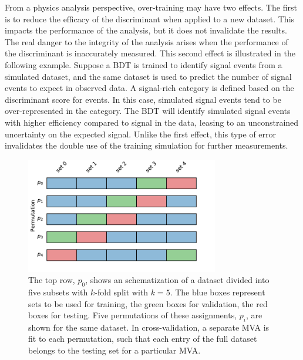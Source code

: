 From a physics analysis perspective, over-training may have two effects.
The first is to reduce the efficacy of the discriminant when applied to a new dataset.
This impacts the performance of the analysis, but it does not invalidate the results.
The real danger to the integrity of the analysis arises when the performance of the discriminant is inaccurately measured.
This second effect is illustrated in the following example.
Suppose a BDT is trained to identify signal events from a simulated dataset, and the same dataset is used to predict the number of signal events to expect in observed data.
A signal-rich category is defined based on the discriminant score for events.
In this case, simulated signal events tend to be over-represented in the category.
The BDT will identify simulated signal events with higher efficiency compared to signal in the data, leasing to an unconstrained uncertainty on the expected signal.
Unlike the first effect, this type of error invalidates the double use of the training simulation for further measurements.

\begin{figure}[h!]
\captionsetup[subfigure]{position=b}
\centering
\includegraphics[width=0.75\textwidth]{figures/hmm/testTrainVal.pdf}
\caption{The top row, $p_0$, shows an schematization of a dataset divided into five subsets with $k$-fold split with $k=5$.
The blue boxes represent sets to be used for training, the green boxes for validation, the red boxes for testing.
Five permutations of these assignments, $p_i$, are shown for the same dataset.
In cross-validation, a separate MVA is fit to each permutation, such that each entry of the full dataset belongs to the testing set for a particular MVA.
}
\label{fig:testTrainVal}
\end{figure}

